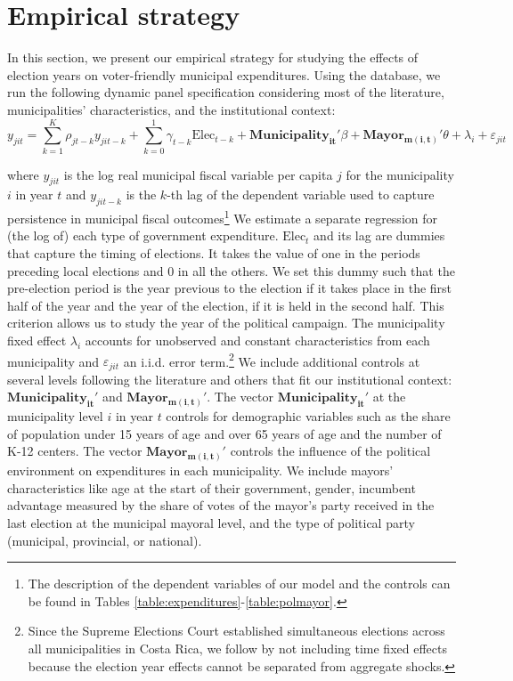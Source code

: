\section{Empirical strategy}\label{sec:empirical_strategy}

In this section, we present our empirical strategy for studying the effects of election years on voter-friendly municipal expenditures. Using the database, we run the following dynamic panel specification considering most of the literature, municipalities' characteristics, and the institutional context: 
\begin{equation}\label{eq:main_specification}
	y_{jit} = \sum_{k=1}^{K} \rho_{jt-k} y_{jit-k} + \sum_{k=0}^{1} \gamma_{t-k} \text{Elec}_{t-k} + \mathbf{Municipality_{it}'}\beta + \mathbf{Mayor_{m(i,t)}'}\theta + \lambda_i + \varepsilon_{jit}
\end{equation}

where $y_{jit}$ is the log real municipal fiscal variable per capita $j$ for the municipality $i$ in year $t$ and $y_{jit-k}$ is the $k$-th lag of the dependent variable used to capture persistence in municipal fiscal outcomes\footnote{The description of the dependent variables of our model and the controls can be found in Tables \ref{table:expenditures}-\ref{table:polmayor}. } We estimate a separate regression for (the log of) each type of government expenditure. $\text{Elec}_t$ and its lag are dummies that capture the timing of elections. It takes the value of one in the periods preceding local elections and 0 in all the others. We set this dummy such that the pre-election period is the year previous to the election if it takes place in the first half of the year and the year of the election, if it is held in the second half. This criterion allows us to study the year of the political campaign. The municipality fixed effect $\lambda_i$ accounts for unobserved and constant characteristics from each municipality and $\varepsilon_{jit}$ an i.i.d. error term.\footnote{Since the Supreme Elections Court established simultaneous elections across all municipalities in Costa Rica, we follow \textcite{chortareas2016} by not including time fixed effects because the election year effects cannot be separated from aggregate shocks. }  We include additional controls at several levels following the literature and others that fit our institutional context: $\mathbf{Municipality_{it}'}$ and $\mathbf{Mayor_{m(i,t)}'}$. The vector $\mathbf{Municipality_{it}'}$ at the municipality level $i$ in year $t$ controls for demographic variables such as the share of population under 15 years of age and over 65 years of age and the number of K-12 centers. The vector $\mathbf{Mayor_{m(i,t)}'}$ controls the influence of the political environment on expenditures in each municipality. We include mayors' characteristics like age at the start of their government, gender, incumbent advantage measured by the share of votes of the mayor's party received in the last election at the municipal mayoral level, and the type of political party (municipal, provincial, or national). 

